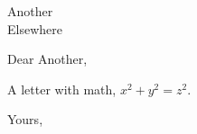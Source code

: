\documentclass{letter}
\begin{document}
\begin{letter}{Another\\ Elsewhere}
\opening{Dear Another,}
A letter with math, $x^2 + y^2 = z^2$.
\closing{Yours,}
\end{letter}
\end{document}
